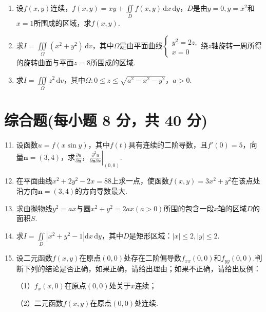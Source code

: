 \documentclass[../main.tex]{subfiles}
\begin{document}
\begin{enumerate}
    \item 设$f(x,y)$连续，$f(x,y)=xy+\iint\limits_{D}f(x,y)\,\mathrm{d}x\,\mathrm{d}y$，$D$是由$y
              =0,y=x^{2}$和$x=1$所围成的区域，求$f(x,y)$.
          \vspace{11em}

    \item 求$I=\iiint\limits_{\Omega}\left(x^{2}+y^{2}\right)\,\mathrm{d}v$，其中$\Omega$是由平面曲线$\begin{cases}
                  y^{2}=2z, \\
                  x=0
              \end{cases}$绕$z$轴旋转一周所得的旋转曲面与平面$z=8$所围成的区域.
          \vspace{11em}

    \item 求$I=\iiint\limits_{\Omega}z^{2}\,\mathrm{d}v$，其中$\Omega:0\leq z \leq \sqrt{a^{2}-x^{2}-y^{2}}$，$a
              >0$.
          \vspace{11em}
\end{enumerate}

\section{综合题(每小题 8 分，共 40 分)}
\begin{enumerate}
    \setcounter{enumi}{10}

    \item 设函数$u=f(x\sin y)$，其中$f(t)$具有连续的二阶导数，且$f'(0)=5$，向量$\boldsymbol
              {n}=(3,4)$，求$\frac{\partial u}{\partial \boldsymbol{n}}$，$\left.\frac{\partial^{2}
                  u}{\partial \boldsymbol{n}\partial x}\right|_{(0,0)}$.
          \vspace{10em}

    \item 在平面曲线$x^{2}+2y^{2}-2x=88$上求一点，使函数$f(x,y)=3x^{2}+y^{2}$在该点处沿方向$\boldsymbol
              {n}=(3,4)$的方向导数最大.
          \vspace{11em}

    \item 求由抛物线$y^{2}=ax$与圆$x^{2}+y^{2}=2ax(a>0)$所围的包含一段$x$轴的区域$D$的面积$S$.
          \vspace{11em}

    \item 求$I=\iint\limits_{D}\left|x^{2}+y^{2}-1\right|\mathrm{d}x\,\mathrm{d}y$，其中$D$是矩形区域：$|
              x|\leq 2, |y|\leq 2$.
          \vspace{11em}

    \item 设二元函数$f(x,y)$在原点$(0,0)$处存在二阶偏导数$f_{xx}(0,0)$和$f_{yy}(0
              ,0)$.判断下列的结论是否正确，如果正确，请给出理由；如果不正确，请给出反例：

          （1）$f_{x}(x,0)$在原点$(0,0)$处关于$x$连续；

          （2）二元函数$f(x,y)$在原点$(0,0)$处连续.
          \vspace{11em}
\end{enumerate}
\end{document}
